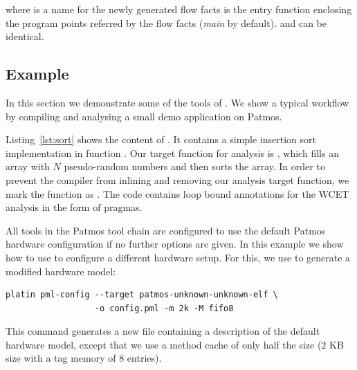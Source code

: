 where  is a name for the newly generated flow facts
 is the entry function enclosing the program points referred by
the flow facts (\emph{main} by default).
%
 and  can be identical.


\subsection{Example}
\label{sec:toolchain:platin:example}


In this section we demonstrate some of the tools of . We show a typical workflow by compiling and
analysing a small demo application on Patmos.

\lstset{language=C}
%


Listing~\ref{lst:sort} shows the content of . It contains a simple insertion sort implementation in
function . Our target function for analysis is , which fills an array with $N$
pseudo-random numbers and then sorts the array. In order to prevent the compiler from inlining and removing our
analysis target function, we mark the function as .
The code contains loop bound annotations for the WCET analysis in the form of pragmas.

All tools in the Patmos tool chain are configured to use the default Patmos hardware configuration if no
further options are given. In this example we show how to use  to configure a different hardware setup.
For this, we use  to generate a modified hardware model:

\begin{verbatim}
platin pml-config --target patmos-unknown-unknown-elf \
                  -o config.pml -m 2k -M fifo8
\end{verbatim}

This command generates a new  file containing a description of the default hardware model,
except that we use a method cache of only half the size ($2$ KB size with a tag memory of $8$ entries).

